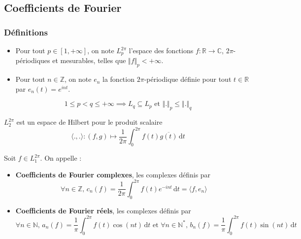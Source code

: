 




	\subsection{Coefficients de Fourier}

	\subsubsection{Définitions}


	\begin{notation}
		\begin{itemize}
			\item Pour tout $p \in [1, +\infty]$, on note $L_p^{2\pi}$ l'espace des fonctions $f : \mathbb{R} \rightarrow \mathbb{C}$, $2\pi$-périodiques et mesurables, telles que $\Vert f \Vert_p < +\infty$.
			\item Pour tout $n \in \mathbb{Z}$, on note $e_n$ la fonction $2\pi$-périodique définie pour tout $t \in \mathbb{R}$ par $e_n(t) = e^{int}$.
		\end{itemize}
	\end{notation}

	\begin{remark}
		\[ 1 \leq p < q \leq +\infty \implies L_q \subseteq L_p \text{ et } \Vert . \Vert_p \leq \Vert . \Vert_q \]
	\end{remark}

	\begin{proposition}
		$L_2^{2\pi}$ est un espace de Hilbert pour le produit scalaire
		\[ \langle ., . \rangle : (f, g) \mapsto \frac{1}{2 \pi} \int_0^{2\pi} f(t) \overline{g(t)} \, \mathrm{d}t \]
	\end{proposition}


	\begin{definition}
		Soit $f \in L_1^{2\pi}$. On appelle :
		\begin{itemize}
			\item \textbf{Coefficients de Fourier complexes}, les complexes définis par
			\[ \forall n \in \mathbb{Z}, \, c_n(f) = \frac{1}{2 \pi} \int_0^{2\pi} f(t) e^{-int} \, \mathrm{d}t = \langle f, e_n \rangle \]
			\item \textbf{Coefficients de Fourier réels}, les complexes définis par
			\[ \forall n \in \mathbb{N}, \, a_n(f) = \frac{1}{\pi} \int_0^{2\pi} f(t) \cos(nt) \, \mathrm{d}t \text{ et } \forall n \in \mathbb{N}^*, \, b_n(f) = \frac{1}{\pi} \int_0^{2\pi} f(t) \sin(nt) \, \mathrm{d}t \]
		\end{itemize}
	\end{definition}


